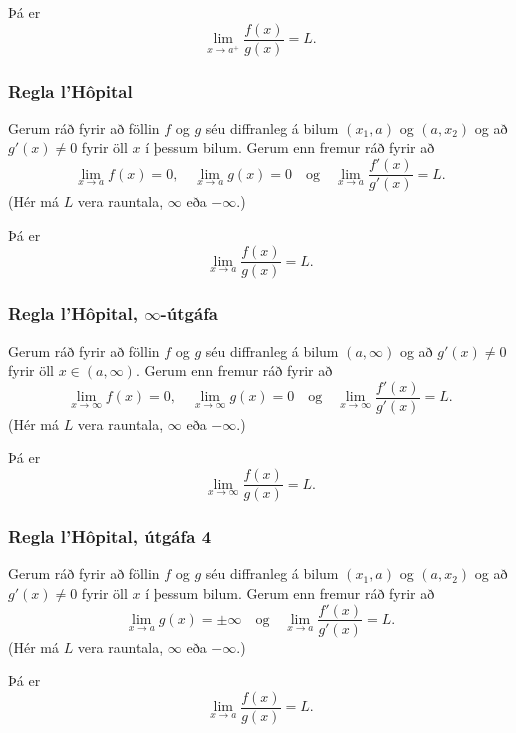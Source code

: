 \documentclass[icelandic,a4paper,12pt]{article}
\begin{document}
Þá er 
$$\lim_{x\rightarrow a^+}\frac{f(x)}{g(x)}=L.$$

\subsubsection{Regla l'H\^opital} 
Gerum ráð fyrir að föllin $f$ og $g$ séu diffranleg á bilum $(x_1, a)$
og $(a, x_2)$
 og að $g'(x)\neq 0$ fyrir öll $x$ í þessum bilum.\pause
Gerum enn fremur ráð fyrir að 
$$\lim_{x\rightarrow a}f(x)=0, \quad \lim_{x\rightarrow a}g(x)=0
\quad\mbox{og}\quad \lim_{x\rightarrow a}\frac{f'(x)}{g'(x)}=L.$$
(Hér má $L$ vera rauntala, $\infty$ eða $-\infty$.) \pause

Þá er $$\lim_{x\rightarrow a}\frac{f(x)}{g(x)}=L.$$

\subsubsection{Regla l'H\^opital, $\infty$-útgáfa}
 Gerum ráð fyrir að föllin $f$ og $g$ séu diffranleg á bilum $(a, \infty)$
 og að $g'(x)\neq 0$ fyrir öll $x\in (a, \infty)$. \pause
Gerum enn fremur ráð fyrir að 
$$\lim_{x\rightarrow \infty}f(x)=0, \quad \lim_{x\rightarrow \infty}g(x)=0
\quad\mbox{og}\quad \lim_{x\rightarrow \infty}\frac{f'(x)}{g'(x)}=L.$$
(Hér má $L$ vera rauntala, $\infty$ eða $-\infty$.) \pause

Þá er $$\lim_{x\rightarrow \infty}\frac{f(x)}{g(x)}=L.$$

\subsubsection{Regla l'H\^opital, útgáfa 4}
Gerum ráð fyrir að föllin $f$ og $g$ séu diffranleg á bilum $(x_1, a)$
og $(a, x_2)$ og að $g'(x)\neq 0$ fyrir öll $x$ í þessum bilum. \pause
Gerum enn fremur ráð fyrir að 
$$\lim_{x\rightarrow a}g(x)=\pm\infty
\quad\mbox{og}\quad \lim_{x\rightarrow a}\frac{f'(x)}{g'(x)}=L.$$
(Hér má $L$ vera rauntala, $\infty$ eða $-\infty$.)  \pause

Þá er 
$$\lim_{x\rightarrow a}\frac{f(x)}{g(x)}=L.$$
\end{document}
